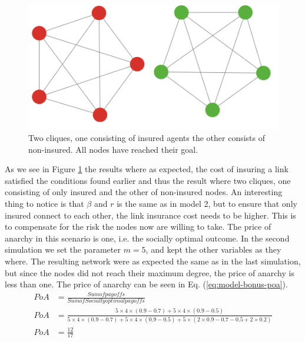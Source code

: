 \begin{figure}[h]
\centering
  \includegraphics[width=0.8\linewidth]{../Figures/BonusGameInsuredClique.png}
  \caption{\label{fig:bonusoptimal} Two cliques, one consisting of insured agents the other consists of non-insured. All nodes have reached their goal. }
\end{figure}
As we see in Figure \ref{fig:bonusoptimal} the results where as expected, the cost of insuring a link satisfied the conditions found earlier and thus the result where two cliques, one consisting of only insured and the other of non-insured nodes.
An interesting thing to notice is that $\beta$ and $r$ is the same as in model 2, but to ensure that only insured connect to each other, the link insurance cost needs to be higher. This is to compensate for the risk the nodes now are willing to take. The price of anarchy in this scenario is one, i.e. the socially optimal outcome. 
In the second simulation we set the parameter $m=5$, and kept the other variables as they where. The resulting network were as expected the same as in the last simulation, but since the nodes did not reach their maximum degree, the price of anarchy  is less than one. The price of anarchy can be seen in Eq. (\ref{eq:model-bonus-poa}).
\begin{eqnarray}
PoA&=\frac{Sum of payoffs}{Sum of Socially optimal payoffs}  \nonumber \\
PoA&=\frac{5\times 4\times (0.9-0.7)+5\times 4\times(0.9-0.5)}{5\times 4\times (0.9-0.7)+5\times 4\times(0.9-0.5)+5\times (2\times 0.9-0.7-0.5 + 2 \times 0.2)}\nonumber \\
PoA&=\frac{12}{17}
\label{eq:model-bonus-poa}
\end{eqnarray}

